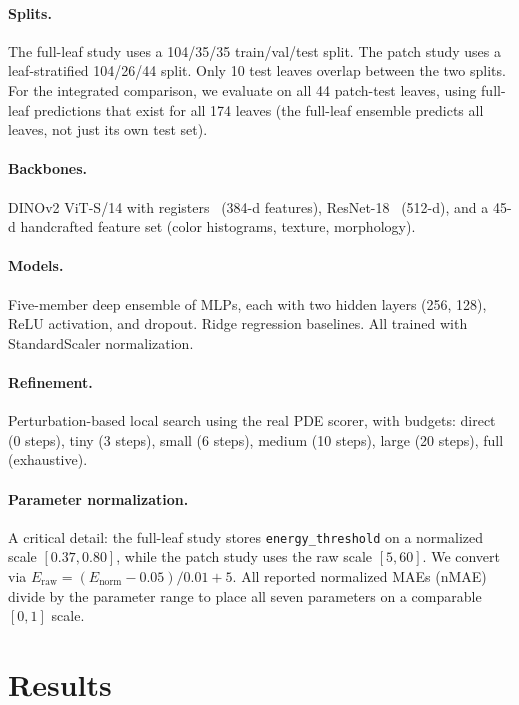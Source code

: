 \documentclass[11pt]{article}
\begin{document}
\paragraph{Splits.}
The full-leaf study uses a 104/35/35 train/val/test split.  The patch study uses a leaf-stratified 104/26/44 split.  Only 10 test leaves overlap between the two splits.  For the integrated comparison, we evaluate on all 44 patch-test leaves, using full-leaf predictions that exist for all 174 leaves (the full-leaf ensemble predicts all leaves, not just its own test set).

\paragraph{Backbones.}
DINOv2 ViT-S/14 with registers~\citep{oquab2024dinov2,darcet2024vision} (384-d features), ResNet-18~\citep{he2016deep} (512-d), and a 45-d handcrafted feature set (color histograms, texture, morphology).

\paragraph{Models.}
Five-member deep ensemble of MLPs, each with two hidden layers (256, 128), ReLU activation, and dropout.  Ridge regression baselines.  All trained with StandardScaler normalization.

\paragraph{Refinement.}
Perturbation-based local search using the real PDE scorer, with budgets: direct (0 steps), tiny (3 steps), small (6 steps), medium (10 steps), large (20 steps), full (exhaustive).

\paragraph{Parameter normalization.}
A critical detail: the full-leaf study stores \texttt{energy\_threshold} on a normalized scale $[0.37, 0.80]$, while the patch study uses the raw scale $[5, 60]$.  We convert via $E_{\mathrm{raw}} = (E_{\mathrm{norm}} - 0.05) / 0.01 + 5$.  All reported normalized MAEs (nMAE) divide by the parameter range to place all seven parameters on a comparable $[0,1]$ scale.


\section{Results}
\label{sec:results}
\end{document}
